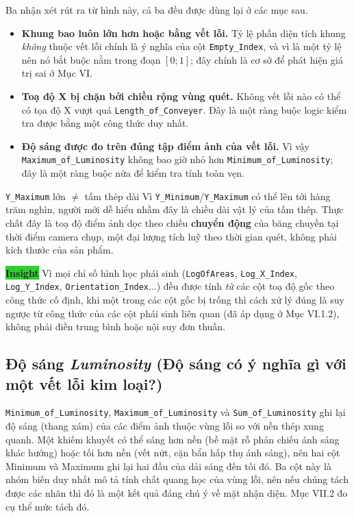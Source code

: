 \documentclass[12pt]{article}
\begin{document}
\noindent Ba nhận xét rút ra từ hình này, cả ba đều được dùng lại ở các mục sau.

\begin{itemize}
  \item \textbf{Khung bao luôn lớn hơn hoặc bằng vết lỗi.} Tỷ lệ phần diện tích khung \emph{không} thuộc vết lỗi chính là ý nghĩa của cột \texttt{Empty\_Index}, và vì là một tỷ lệ nên nó bắt buộc nằm trong đoạn $[0;1]$; đây chính là cơ sở để phát hiện giá trị sai ở Mục VI.
  \item \textbf{Toạ độ X bị chặn bởi chiều rộng vùng quét.} Không vết lỗi nào có thể có tọa độ X vượt quá \texttt{Length\_of\_Conveyer}. Đây là một ràng buộc logic kiểm tra được bằng một công thức duy nhất.
  \item \textbf{Độ sáng được đo trên đúng tập điểm ảnh của vết lỗi.} Vì vậy \texttt{Maximum\_of\_Luminosity} không bao giờ nhỏ hơn \texttt{Minimum\_of\_Luminosity}; đây là một ràng buộc nữa để kiểm tra tính toàn vẹn.
\end{itemize}

\begin{misconceptionbox}{\texttt{Y\_Maximum} lớn $\neq$ tấm thép dài}
Vì \texttt{Y\_Minimum}/\texttt{Y\_Maximum} có thể lên tới hàng trăm nghìn, người mới dễ hiểu nhầm đây là chiều dài vật lý của tấm thép. Thực chất đây là toạ độ điểm ảnh dọc theo chiều \textbf{chuyển động} của băng chuyền tại thời điểm camera chụp, một đại lượng tích luỹ theo thời gian quét, không phải kích thước của sản phẩm.
\end{misconceptionbox}

\noindent \colorbox{LimeGreen}{\textbf{Insight}} Vì mọi chỉ số hình học phái sinh (\texttt{LogOfAreas}, \texttt{Log\_X\_Index}, \texttt{Log\_Y\_Index}, \texttt{Orientation\_Index}...) đều được tính \emph{từ} các cột toạ độ gốc theo công thức cố định, khi một trong các cột gốc bị trống thì cách xử lý đúng là suy ngược từ công thức của các cột phái sinh liên quan (đã áp dụng ở Mục VI.1.2), không phải điền trung bình hoặc nội suy đơn thuần.

\subsection{Độ sáng \textit{Luminosity} (Độ sáng có ý nghĩa gì với một vết lỗi kim loại?)}

\texttt{Minimum\_of\_Luminosity}, \texttt{Maximum\_of\_Luminosity} và \texttt{Sum\_of\_Luminosity} ghi lại độ sáng (thang xám) của các điểm ảnh thuộc vùng lỗi so với nền thép xung quanh. Một khiếm khuyết có thể sáng hơn nền (bề mặt rỗ phản chiếu ánh sáng khác hướng) hoặc tối hơn nền (vết nứt, cặn bẩn hấp thụ ánh sáng), nên hai cột Minimum và Maximum ghi lại hai đầu của dải sáng đến tối đó. Ba cột này là nhóm biến duy nhất mô tả tính chất quang học của vùng lỗi, nên nếu chúng tách được các nhãn thì đó là một kết quả đáng chú ý về mặt nhận diện. Mục VII.2 đo cụ thể mức tách đó.
\end{document}
